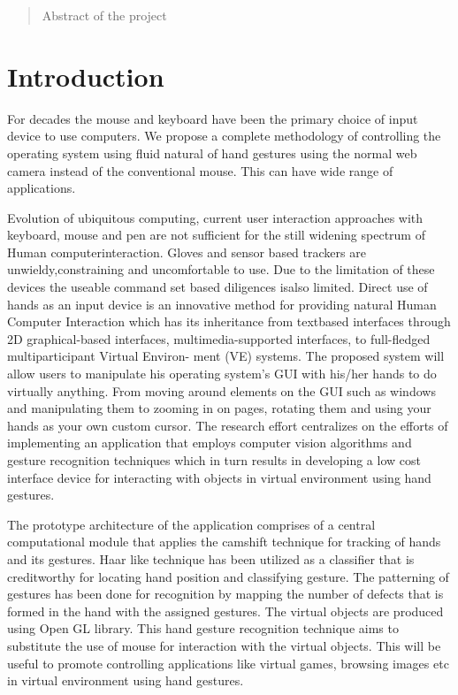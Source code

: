 \documentclass[11pt]{report}
\begin{document}
\begin{abstract}

Abstract of the project 
\end{abstract}

\tableofcontents

\cleardoublepage

\listoffigures

\cleardoublepage

\listoftables
 
\newpage

\chapter{Introduction}

For decades the mouse and keyboard have been the primary choice of input device to use computers. We propose a complete methodology of controlling the operating system using fluid natural of hand gestures using the normal web camera instead of the conventional mouse. This can have wide range of applications.

Evolution of ubiquitous computing, current user interaction approaches with keyboard, mouse and pen are not sufficient for the still widening spectrum of Human computerinteraction. Gloves and sensor based trackers are unwieldy,constraining and uncomfortable to use. Due to the limitation of these devices the useable command set based diligences isalso limited. Direct use of hands as an input device is an innovative method for providing natural Human Computer Interaction which has its inheritance from textbased interfaces through 2D graphical-based interfaces, multimedia-supported interfaces, to full-fledged multiparticipant Virtual Environ-
ment (VE) systems. The proposed system will allow users to
manipulate his operating system’s GUI with his/her hands to do virtually anything. From moving around elements on the GUI such as windows and manipulating them to zooming in on pages, rotating them and using your hands as your own custom cursor. The research effort centralizes on the efforts of implementing an application that employs computer vision algorithms and gesture recognition techniques which in turn results in developing a low cost interface device for interacting with objects in virtual environment using hand gestures.

The prototype architecture of the application comprises of a central computational module that applies the camshift technique for tracking of hands and its gestures. Haar like technique has been utilized as a classifier that is creditworthy for locating hand position and classifying gesture. The patterning of gestures has been done for recognition by mapping the number of defects that is formed in the hand with the assigned gestures. The virtual objects are produced using Open GL library. This hand gesture recognition technique
aims to substitute the use of mouse for interaction with the
virtual objects. This will be useful to promote controlling applications like virtual games, browsing images etc in virtual
environment using hand gestures.
\end{document}

